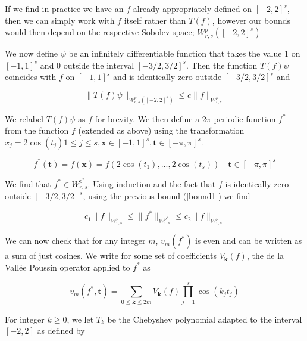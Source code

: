 \documentclass[11pt,a4paper]{article}
\theoremstyle{plain}
\theoremstyle{definition}
\theoremstyle{remark}
\numberwithin{equation}{section}
\begin{document}
If we find in practice we have an \(f\) already appropriately defined on \([-2,2]^s\), then we can simply work with \(f\) itself rather than \(T(f)\), however our bounds would then depend on the respective Sobolev space; \(W_{r,s}^{p}([-2,2]^s)\) 

We now define \(\psi \) be an infinitely differentiable function that takes the value 1 on \([-1,1]^s\) and \(0\)  outside the interval \([-3/2,3/2]^s\). Then the function \(T(f)\psi \) coincides with \(f\) on \([-1,1]^s\) and is identically zero outside \([-3/2,3/2]^s\) and

\begin{equation}
    \|T(f)\psi\|_{W_{r,s}^{p}([-2,2]^s)} \leq c \|f\|_{W_{r,s}^{p}}  
    \label{bound1}
\end{equation}

We relabel \(T(f)\psi\) as \(f\) for brevity. We then define a 2\(\pi\)-periodic function \(f^*\) from the function \(f\) (extended as above) using the transformation \(x_{j} = 2 \cos (t_{j}) 1 \leq j \leq s, \mathbf{x} \in [-1,1]^s, \mathbf{t} \in [-\pi ,\pi ]^s\).

\begin{equation}    
    f^*(\mathbf{t}) = f(\mathbf{x}) = f(2 \cos(t_1),...,2 \cos(t_s)) \quad \mathbf{t} \in [-\pi ,\pi ]^s
\end{equation}

We find that \(f^{\ast} \in W_{r,s}^{p^{\ast}}\). Using induction and the fact that \(f\) is identically zero outside \([-3/2,3/2]^s\), using the previous bound (\ref{bound1}) we find

\begin{equation}
    c_{1} \|f\|_{W_{r,s}^{p}} \leq \|f^{\ast}\|_{W_{r,s}^{p^{\ast}}} \leq c_{2} \|f\|_{W_{r,s}^{p}}
\end{equation}

We can now check that for any integer \(m\), \(v_{m}(f^{\ast} )\) is even and can be written as a sum of just cosines. We write for some set of coefficients \(V_{\mathbf{k} }(f)\), the de la Vallée Poussin operator applied to \(f^{\ast}\) as

\begin{equation}
    v_{m}(f^{\ast}, \mathbf{t} ) = \sum_{0 \leq \mathbf{k} \leq 2m} V_{\mathbf{k}}(f) \prod_{j=1}^{s} \cos(k_{j}t_{j})
\end{equation}

For integer \(k \geq 0 \), we let \(T_{k}\) be the Chebyshev polynomial adapted to the interval \([-2,2]\) as defined by
\end{document}
